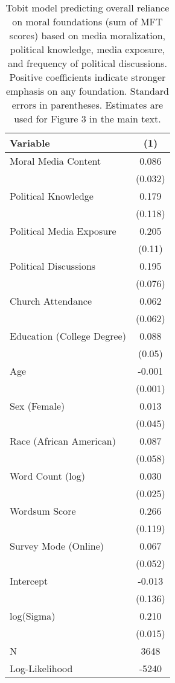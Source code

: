 \begin{table}[ht]
\centering
\caption{Tobit model predicting overall reliance on moral foundations
           (sum of MFT scores) based on media moralization, political knowledge, media exposure, and frequency of 
           political discussions. Positive coefficients indicate stronger emphasis on any foundation.
           Standard errors in parentheses. Estimates are used for Figure 3 in 
           the main text.} 
\label{tab:tobit_learn}
\begingroup\footnotesize
\begin{tabular}{lc}
  \hline
Variable & (1) \\ 
  \hline
Moral Media Content &  0.086 \\ 
   & (0.032) \\ 
  Political Knowledge &  0.179 \\ 
   & (0.118) \\ 
  Political Media Exposure &  0.205 \\ 
   & (0.11) \\ 
  Political
Discussions &  0.195 \\ 
   & (0.076) \\ 
  Church Attendance &  0.062 \\ 
   & (0.062) \\ 
  Education (College Degree) &  0.088 \\ 
   & (0.05) \\ 
  Age & -0.001 \\ 
   & (0.001) \\ 
  Sex (Female) &  0.013 \\ 
   & (0.045) \\ 
  Race (African American) &  0.087 \\ 
   & (0.058) \\ 
  Word Count (log) &  0.030 \\ 
   & (0.025) \\ 
  Wordsum Score &  0.266 \\ 
   & (0.119) \\ 
  Survey Mode (Online) &  0.067 \\ 
   & (0.052) \\ 
  Intercept & -0.013 \\ 
   & (0.136) \\ 
  log(Sigma) &  0.210 \\ 
   & (0.015) \\ 
   \hline
N & 3648 \\ 
  Log-Likelihood & -5240 \\ 
   \hline
\end{tabular}
\endgroup
\end{table}
